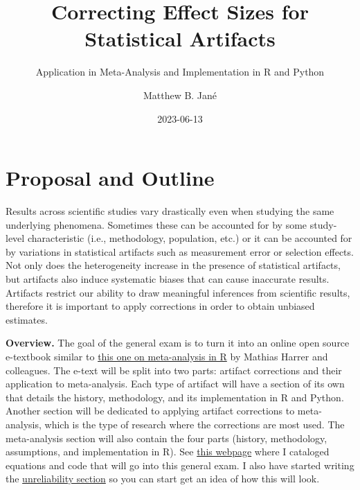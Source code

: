 \documentclass[
  letterpaper,
  DIV=11,
  numbers=noendperiod]{scrreprt}
\title{Correcting Effect Sizes for Statistical Artifacts}
\subtitle{Application in Meta-Analysis and Implementation in R and
Python}
\author{Matthew B. Jané}
\date{2023-06-13}
\renewcommand*\contentsname{Table of contents}
\newcommand\contentsname{Table of contents}
\begin{document}
\maketitle
\ifdefined\Shaded\renewenvironment{Shaded}{\begin{tcolorbox}[interior hidden, borderline west={3pt}{0pt}{shadecolor}, breakable, enhanced, sharp corners, frame hidden, boxrule=0pt]}{\end{tcolorbox}}\fi

\renewcommand*\contentsname{Table of contents}
{
\hypersetup{linkcolor=}
\setcounter{tocdepth}{2}
\tableofcontents
}

\hypertarget{proposal-and-outline}{%
\chapter{Proposal and Outline}\label{proposal-and-outline}}

Results across scientific studies vary drastically even when studying
the same underlying phenomena. Sometimes these can be accounted for by
some study-level characteristic (i.e., methodology, population, etc.) or
it can be accounted for by variations in statistical artifacts such as
measurement error or selection effects. Not only does the heterogeneity
increase in the presence of statistical artifacts, but artifacts also
induce systematic biases that can cause inaccurate results. Artifacts
restrict our ability to draw meaningful inferences from scientific
results, therefore it is important to apply corrections in order to
obtain unbiased estimates.

\textbf{Overview.} The goal of the general exam is to turn it into an
online open source e-textbook similar to
\href{https://bookdown.org/MathiasHarrer/Doing_Meta_Analysis_in_R/}{this
one on meta-analysis in R} by Mathias Harrer and colleagues. The e-text
will be split into two parts: artifact corrections and their application
to meta-analysis. Each type of artifact will have a section of its own
that details the history, methodology, and its implementation in R and
Python. Another section will be dedicated to applying artifact
corrections to meta-analysis, which is the type of research where the
corrections are most used. The meta-analysis section will also contain
the four parts (history, methodology, assumptions, and implementation in
R). See \href{https://MatthewBJane.github.io/artifact-corrections}{this
webpage} where I cataloged equations and code that will go into this
general exam. I also have started writing the
\protect\hyperlink{unreliability}{unreliability section} so you can
start get an idea of how this will look.
\end{document}
